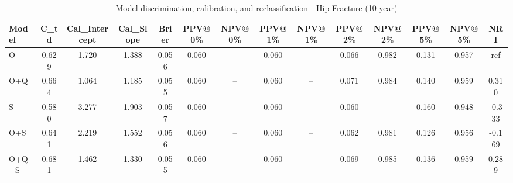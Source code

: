 \begin{table}[htbp]
\centering
\small
\caption{Model discrimination, calibration, and reclassification - Hip Fracture (10-year)}
\label{tab:perf_pd_10y}
\begin{tabular}{lccccccccccccc}
\toprule
Model & C\_td & Cal\_Intercept & Cal\_Slope & Brier & PPV@0\% & NPV@0\% & PPV@1\% & NPV@1\% & PPV@2\% & NPV@2\% & PPV@5\% & NPV@5\% & NRI \\
\midrule
O & 0.629 & 1.720 & 1.388 & 0.056 & 0.060 & -- & 0.060 & -- & 0.066 & 0.982 & 0.131 & 0.957 & ref \\
O+Q & 0.664 & 1.064 & 1.185 & 0.055 & 0.060 & -- & 0.060 & -- & 0.071 & 0.984 & 0.140 & 0.959 & 0.310 \\
S & 0.580 & 3.277 & 1.903 & 0.057 & 0.060 & -- & 0.060 & -- & 0.060 & -- & 0.160 & 0.948 & -0.333 \\
O+S & 0.641 & 2.219 & 1.552 & 0.056 & 0.060 & -- & 0.060 & -- & 0.062 & 0.981 & 0.126 & 0.956 & -0.169 \\
O+Q+S & 0.681 & 1.462 & 1.330 & 0.055 & 0.060 & -- & 0.060 & -- & 0.069 & 0.985 & 0.136 & 0.959 & 0.289 \\
\bottomrule
\end{tabular}
\end{table}